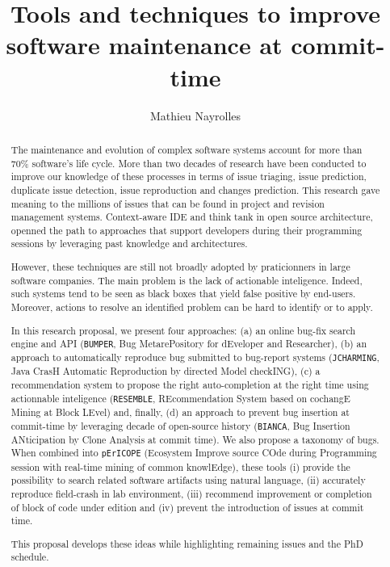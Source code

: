 \documentclass[11pt,a4paper, cuthesis]{report}
\author{Mathieu Nayrolles}
\title{Tools and techniques to improve software maintenance at commit-time}
\begin{document}
\begin{abstract}

  The maintenance and evolution of complex software systems account for more than 70\% software's life cycle.
  More than two decades of research have been conducted to improve our knowledge of these processes in terms of issue triaging, issue prediction, duplicate issue detection, issue reproduction and changes prediction.
  This research gave meaning to the millions of issues that can be found in project and revision management systems.
  Context-aware IDE and think tank in open source architecture, openned the path to approaches that support developers during their programming sessions by leveraging past knowledge and architectures.

  However, these techniques are still not broadly adopted by praticionners in large software companies.
  The main problem is the lack of actionable inteligence.
  Indeed, such systems tend to be seen as black boxes that yield false positive by end-users.
  Moreover, actions to resolve an identified problem can be hard to identify or to apply.

  In this research proposal, we present four approaches: (a) an online bug-fix search engine and API ({\tt BUMPER}, Bug MetarePository for dEveloper and Researcher), (b) an approach to automatically reproduce bug submitted to bug-report systems ({\tt JCHARMING}, Java CrasH Automatic Reproduction by directed Model checkING), (c) a recommendation system to propose the right auto-completion at the right time using actionnable inteligence ({\tt RESEMBLE}, REcommendation System based on cochangE Mining at Block LEvel) and, finally, (d) an approach to prevent bug insertion at commit-time by leveraging decade of open-source history ({\tt BIANCA}, Bug Insertion ANticipation by Clone Analysis at commit time).
  We also propose a taxonomy of bugs.
  When combined into {\tt pErICOPE} (Ecosystem Improve source COde during Programming session with real-time mining of common knowlEdge), these tools (i) provide the possibility to search related software artifacts using natural language, (ii) accurately reproduce field-crash in lab environment, (iii) recommend improvement or completion of block of code under edition and (iv) prevent the introduction of issues at commit time.

  This proposal develops these ideas while highlighting remaining issues and the PhD schedule.
\end{abstract}

\tableofcontents
\listoffigures
\listoftables










\end{document}
